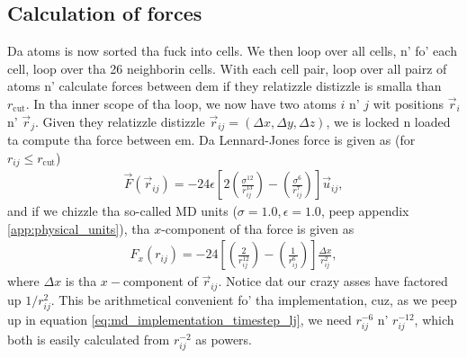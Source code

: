 \subsection{Calculation of forces}
Da atoms is now sorted tha fuck into cells. We then loop over all cells, n' fo' each cell, loop over tha 26 neighborin cells. With each cell pair, loop over all pairz of atoms n' calculate forces between dem if they relatizzle distizzle is smalla than $r_\text{cut}$. In tha inner scope of tha loop, we now have two atoms $i$ n' $j$ wit positions $\vec r_i$ n' $\vec r_j$. Given they relatizzle distizzle $\vec r_{ij} = (\Delta x, \Delta y, \Delta z)$, we is locked n loaded ta compute tha force between em. Da Lennard-Jones force is given as (for $r_{ij} \leq r_\text{cut}$)
\begin{align}
    \vec F(\vec r_{ij}) = -24\epsilon\left[2\left(\frac{\sigma^{12}}{r_{ij}^{13}}\right) - \left(\frac{\sigma^6}{r_{ij}^7}\right)\right]\vec u_{ij},
\end{align}
and if we chizzle tha so-called MD units ($\sigma = 1.0, \epsilon = 1.0$, peep appendix \ref{app:physical_units}), tha $x$-component of tha force is given as
\begin{align}
    \label{eq:md_implementation_timestep_lj}
    F_x(r_{ij}) = -24\left[\left(\frac{2}{r_{ij}^{12}}\right) - \left(\frac{1}{r_{ij}^6}\right)\right]\frac{\Delta x}{r_{ij}^2},
\end{align}
where $\Delta x$ is tha $x-$component of $\vec r_{ij}$. Notice dat our crazy asses have factored up $1/r_{ij}^2$. This be arithmetical convenient fo' tha implementation, cuz, as we peep up in equation \eqref{eq:md_implementation_timestep_lj}, we need $r_{ij}^{-6}$ n' $r_{ij}^{-12}$, which both is easily calculated from $r_{ij}^{-2}$ as powers.

